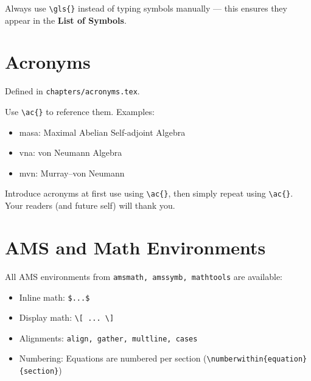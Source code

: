 \begin{tcolorbox}[colback=goldenrod!10,colframe=crimson,title=Tip]
Always use \verb|\gls{}| instead of typing symbols manually — this ensures they appear in the \textbf{List of Symbols}.
\end{tcolorbox}

\section{Acronyms}
Defined in \verb|chapters/acronyms.tex|.  

Use \verb|\ac{}| to reference them. Examples:

\begin{itemize}
    \item \ac{masa}: Maximal Abelian Self-adjoint Algebra  
    \item \ac{vna}: von Neumann Algebra  
    \item \ac{mvn}: Murray–von Neumann  
\end{itemize}

\begin{tcolorbox}[colback=softblue!10,colframe=royalblue,title=Tip]
Introduce acronyms at first use using \verb|\ac{}|, then simply repeat using \verb|\ac{}|. Your readers (and future self) will thank you.
\end{tcolorbox}

\section{AMS and Math Environments}
All AMS environments from \verb|amsmath, amssymb, mathtools| are available:
\begin{itemize}
    \item Inline math: \verb|$...$|
    \item Display math: \verb|\[ ... \]|
    \item Alignments: \verb|align, gather, multline, cases|
    \item Numbering: Equations are numbered per section (\verb|\numberwithin{equation}{section}|)
\end{itemize}

